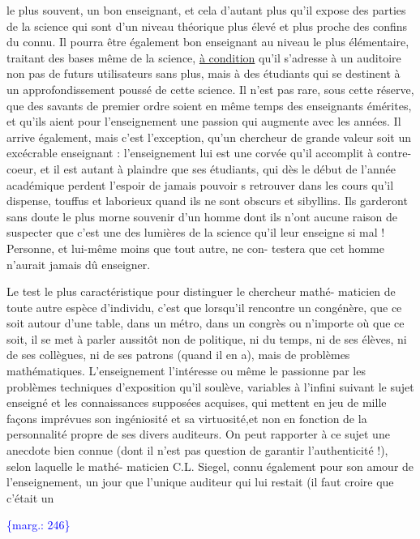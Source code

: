 \documentclass[11pt]{article}
\newcommand{\scanpage}[1]{\par\bigskip\noindent{\small\sffamily[scan #1]}\par}
\newcommand{\mspage}[1]{{\small\sffamily[p.\,#1]}}
\let\over\relax
\newcommand{\over}[2]{\textcolor{gray}{#1}\textcolor{blue}{\ensuremath{^{\!\nearrow}}#2}}
\newcommand{\margin}[1]{\textcolor{blue}{\{\textsf{marg.:} #1\}}}
\newcommand{\uline}[1]{\underline{#1}}
\newcommand{\unsure}[1]{[#1?]}
\begin{document}
le plus souvent, un bon enseignant, et cela d'autant plus qu'il expose des
parties de la science qui sont d'un niveau théorique plus élevé et plus
proche des confins du connu. Il pourra être également bon enseignant au
niveau le plus élémentaire, traitant des bases même de la science, \uline{à condition}
qu'il s'adresse à un auditoire non pas de futurs utilisateurs sans plus,
mais à des étudiants qui se destinent à un approfondissement poussé de cette
science. Il n'est pas rare, sous cette réserve, que des savants de premier
ordre soient en même temps des enseignants émérites, et qu'ils aient pour
l'enseignement une passion qui augmente avec les années. Il arrive également,
mais c'est l'exception, qu'un chercheur de grande valeur soit un excécrable
enseignant : l'enseignement lui est une corvée qu'il accomplit à contre-coeur,
et il est autant à plaindre que ses étudiants, qui dès le début de l'année
académique perdent l'espoir de jamais pouvoir s\over{\unsure{'y}}{\unsure{'y}} retrouver dans les cours
qu'il dispense, touffus et laborieux quand ils ne sont obscurs et sibyllins.
Ils garderont sans doute le plus morne souvenir d'un homme dont ils n'ont
aucune raison de suspecter que c'est une des lumières de la science qu'il
leur enseigne si mal ! Personne, et lui-même moins que tout autre, ne con-%
testera que cet homme n'aurait jamais dû enseigner.

Le test le plus caractéristique pour distinguer le chercheur mathé-%
maticien de toute autre espèce d'individu, c'est que lorsqu'il rencontre
un congénère, que ce soit autour d'une table, dans un métro, dans un congrès
ou n'importe où que ce soit, il se met à parler aussitôt non de politique,
ni du temps, ni de ses élèves, ni de ses collègues, ni de ses patrons (quand
il en a), mais de problèmes mathématiques. L'enseignement l'intéresse ou
même le passionne par les problèmes techniques d'exposition qu'il soulève,
variables à l'infini suivant le sujet enseigné et les connaissances supposées
acquises, qui mettent en jeu de mille façons imprévues son ingéniosité et
sa virtuosité,et non en fonction de la personnalité propre de ses divers
auditeurs. On peut rapporter à ce sujet une anecdote bien connue (dont il
n'est pas question de garantir l'authenticité !), selon laquelle le mathé-%
maticien C.L. Siegel, connu également pour son amour de l'enseignement,
un jour que l'unique auditeur qui lui restait (il faut croire que c'était un

\margin{246}

\clearpage
\scanpage{119/247}
\mspage{7}
\end{document}
